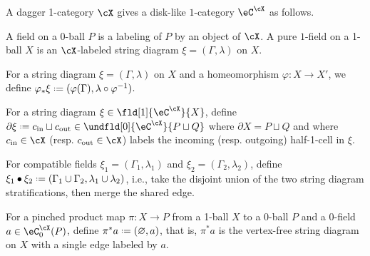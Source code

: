 \documentclass[12pt,reqno]{amsart}
\newcommand{\inn}{\mathrm{in}}
\newcommand{\out}{\mathrm{out}}
\newcommand{\C}{\eC}
\newcommand{\blt}{\bullet}
\renewcommand{\amalg}{\sqcup}
\DeclareRobustCommand{\coloneq}{\mathrel{\vcenter{\baselineskip0.5ex\lineskiplimit0pt\hbox{\scriptsize{\upshape.}}\hbox{\scriptsize{\upshape.}}}}=}
\begin{document}
\begin{construction}
  \label{cstr:disk-like 1-categories from ordinary 1-categories}
  A dagger 1-category $\cX$ gives a disk-like $1$-category $\eC^\cX$ as follows.
  \begin{lst}[leftmargin=.5in]
    \item[\ref{DC1}] A field on a 0-ball $P$ is a labeling of $P$ by an object of $\cX$. A pure $1$-field on a 1-ball $X$ is an $\cX$-labeled string diagram $\xi=(\Gamma,\lambda)$ on $X$.
    \item[\ref{Dvarphi1}] For a string diagram $\xi=(\Gamma,\lambda)$ on $X$ and a homeomorphism $\varphi\colon X\to X'$, we define $\varphi_*\xi\coloneq (\varphi(\Gamma),\lambda\circ \varphi^{-1})$.
      \item[\ref{Dbdy1}] For a string diagram $\xi\in\fld[1]{\eC^\cX}{X}$, define $\partial \xi\coloneq c_\inn\amalg c_\out\in\undfld[0]{\C^\cX}{P\amalg Q}$ where $\partial X=P\amalg Q$ and where $c_\inn\in\cX$ (resp. $c_\out\in\cX$) labels the incoming (resp. outgoing) half-1-cell in $\xi$.
      \item[\ref{DG1}] For compatible fields $\xi_1=(\Gamma_1,\lambda_1)$ and $\xi_2=(\Gamma_2,\lambda_2)$, define $\xi_1\blt\xi_2\coloneq(\Gamma_1\cup\Gamma_2,\lambda_1\cup\lambda_2)$, i.e., take the disjoint union of the two string diagram stratifications, then merge the shared edge.
      \item[\ref{Dpi1}] For a pinched product map $\pi\colon X\to P$ from a 1-ball $X$ to a 0-ball $P$ and a 0-field $a\in\eC^\cX_0(P)$, define $\pi^*a\coloneq(\varnothing,a)$, that is, $\pi^*a$ is the vertex-free string diagram on $X$ with a single edge labeled by $a$. 


\end{lst}
\end{construction}
\end{document}
